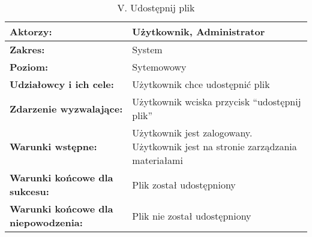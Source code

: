 	\begin{table}[H]
\centering
\caption{V. Udostępnij plik}
\label{Udostepnijplik}
\begin{tabular}{|p{7cm}|p{7cm}|}
  \hline 
  \textbf{Aktorzy:} & Użytkownik, Administrator\\
  \hline
  \textbf{Zakres:} & System \\
	\hline
  \textbf{Poziom:} & Sytemowowy \\
	\hline
  \textbf{Udziałowcy i ich cele: } & Użytkownik chce udostępnić plik \\
	\hline
  \textbf{Zdarzenie wyzwalające: } & Użytkownik wciska przycisk “udostępnij plik” \\
	\hline
  \textbf{Warunki wstępne: } & Użytkownik jest zalogowany. Użytkownik jest na stronie zarządzania materiałami
 \\
	\hline
  \textbf{Warunki końcowe dla sukcesu:} & Plik został udostępniony
 \\
	\hline
  \textbf{Warunki końcowe dla niepowodzenia:} & Plik nie został udostępniony \\
  \hline
\end{tabular} 
\end{table}

